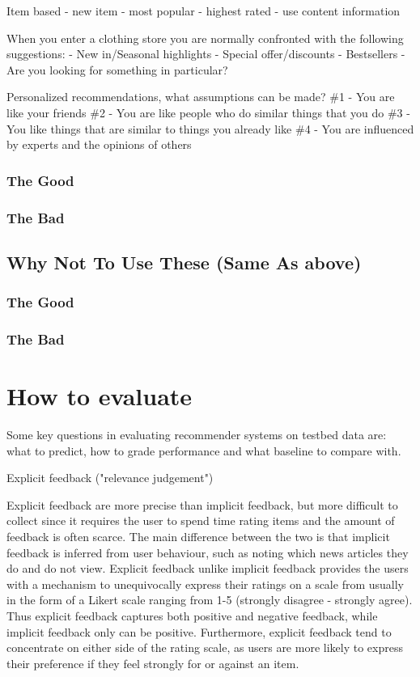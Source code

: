 Item based - new item
	- most popular
	- highest rated
	- use content information

When you enter a clothing store you are normally confronted with the following suggestions:
	- New in/Seasonal highlights
	- Special offer/discounts
	- Bestsellers
	- Are you looking for something in particular?

Personalized recommendations, what assumptions can be made?
\#1 - You are like your friends
\#2 - You are like people who do similar things that you do
\#3 - You like things that are similar to things you already like
\#4 - You are influenced by experts and the opinions of others

\subsubsection{The Good}
\subsubsection{The Bad}
\subsection{Why Not To Use These (Same As above)}
\subsubsection{The Good}
\subsubsection{The Bad}

\section{How to evaluate}


Some key questions in evaluating recommender systems on testbed data are: what to predict, how to grade performance and what baseline to compare with.


Explicit feedback ("relevance judgement")

Explicit feedback are more precise than implicit feedback, but more difficult to collect since it requires the user to spend time rating items and the amount of feedback is often scarce. The main difference between the two is that implicit feedback is inferred from user behaviour, such as noting which news articles they do and do not view. Explicit feedback unlike implicit feedback provides the users with a mechanism to unequivocally express their ratings on a scale from usually in the form of a Likert scale ranging from 1-5 (strongly disagree - strongly agree). Thus explicit feedback captures both positive and negative feedback, while implicit feedback only can be positive. Furthermore, explicit feedback tend to concentrate on either side of the rating scale, as users are more likely to express their preference if they feel strongly for or against an item.

